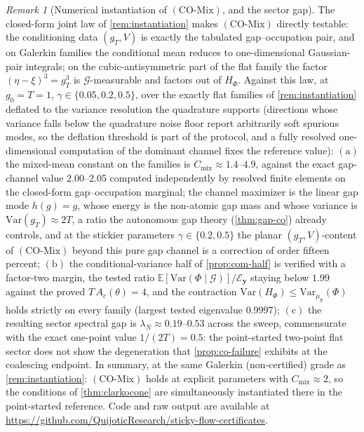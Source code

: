 \documentclass[reqno,final,11pt]{amsart}
\theoremstyle{plain}
\theoremstyle{definition}
\theoremstyle{remark}
\newtheorem{remark}[theorem]{Remark}
\newcommand{\E}{\mathbb E}
\newcommand{\cE}{\mathcal E}
\newcommand{\COmix}{(\mathrm{CO\text{-}Mix})}
\begin{document}
\begin{remark}[Numerical instantiation of $\COmix$, and the sector gap]\label{rem:comix-instantiation}
The closed-form joint law of \cref{rem:instantiation} makes $\COmix$ directly
testable: the conditioning data $(g_T,V)$ is exactly the tabulated
gap--occupation pair, and on Galerkin families the conditional mean reduces to
one-dimensional Gaussian-pair integrals; on the cubic-antisymmetric part of
the flat family the factor $(\eta-\xi)^3=g_T^3$ is $\mathcal G$-measurable and
factors out of $H_\Phi$. Against this law, at $g_0=T=1$,
$\gamma\in\{0.05,0.2,0.5\}$, over the exactly flat families of
\cref{rem:instantiation} deflated to the variance resolution the quadrature
supports (directions whose variance falls below the
quadrature noise floor report arbitrarily soft spurious modes, so the
deflation threshold is part of the protocol, and a fully resolved
one-dimensional computation of the dominant channel fixes the reference
value):
$(\mathrm a)$ the mixed-mean constant on the families is
$C_{\mathrm{mix}}\approx1.4$--$4.9$, against the exact gap-channel value
$2.00$--$2.05$ computed independently by resolved finite elements on the
closed-form gap--occupation marginal; the channel maximizer is the linear gap
mode $h(g)=g$, whose energy is the non-atomic gap mass and whose variance is
$\mathrm{Var}(g_T)\approx2T$, a ratio the autonomous gap theory
(\cref{thm:gap-co}) already controls, and at the stickier parameters
$\gamma\in\{0.2,0.5\}$ the planar $(g_T,V)$-content of $\COmix$ beyond this
pure gap channel is a correction of order fifteen percent;
$(\mathrm b)$ the conditional-variance half of \cref{prop:com-half} is
verified with a factor-two margin, the tested ratio
$\E[\mathrm{Var}(\Phi\mid\mathcal G)]/\cE_{\mathbf y}$ staying below $1.99$
against the proved $T\,A_c(\theta)=4$, and the contraction
$\mathrm{Var}(H_\Phi)\le\mathrm{Var}_{\mu_{\mathbf y}}(\Phi)$ holds strictly
on every family (largest tested eigenvalue $0.9997$);
$(\mathrm c)$ the resulting sector spectral gap is
$\lambda_N\approx0.19$--$0.53$ across the sweep, commensurate with the exact
one-point value $1/(2T)=0.5$: the point-started two-point flat sector does
not show the degeneration that \cref{prop:co-failure} exhibits at the
coalescing endpoint. In summary, at the same Galerkin (non-certified) grade
as \cref{rem:instantiation}: $\COmix$ holds at explicit parameters with
$C_{\mathrm{mix}}\approx2$, so the conditions of \cref{thm:clarkocone} are
simultaneously instantiated there in the point-started reference. Code and raw output are available at
\url{https://github.com/QuijoticResearch/sticky-flow-certificates}.
\end{remark}
\end{document}
